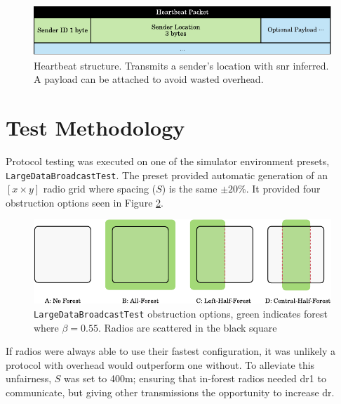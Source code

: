\begin{figure}[H]
    \centering
   	\includegraphics{Figures/heartbeat_packet}
    \caption[Heartbeat Packet]{
    	Heartbeat structure. Transmits a sender's location with \ac{snr} inferred. A payload can be attached to avoid wasted overhead.	
    }
    \label{fig:heartbeat_packet}
\end{figure}


\section{Test Methodology}
Protocol testing was executed on one of the simulator environment presets, \texttt{LargeDataBroadcastTest}. The preset provided automatic generation of an $[x \times y]$ radio grid where spacing ($S$) is the same $\pm 20\%$. It provided four obstruction options seen in Figure \ref{fig:large_broadcast_options}.

\begin{figure}[H]
    \centering
   	\includegraphics{Figures/test_environments}
    \caption[\texttt{LargeDataBroadcastTest} obstruction options]{
    	\texttt{LargeDataBroadcastTest} obstruction options, green indicates forest where $\beta = 0.55$. Radios are scattered in the black square
    }
    \label{fig:large_broadcast_options}
\end{figure}
If radios were always able to use their fastest configuration, it was unlikely a protocol with overhead would outperform one without. To alleviate this unfairness, $S$ was set to 400m; ensuring that in-forest radios needed \ac{dr}1 to communicate, but giving other transmissions the opportunity to increase \ac{dr}. 

